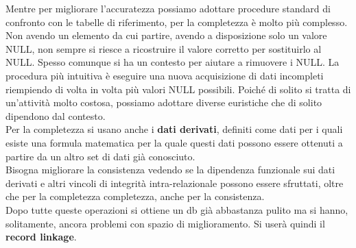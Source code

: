 Mentre per migliorare l'accuratezza possiamo adottare procedure standard di confronto con le tabelle di riferimento, per la completezza è molto più complesso. Non avendo un elemento da cui partire, avendo a disposizione solo un valore NULL, non sempre si riesce a ricostruire il valore corretto per sostituirlo al NULL. Spesso comunque si ha un contesto per aiutare a rimuovere i NULL. La procedura più intuitiva è eseguire una nuova acquisizione di dati incompleti riempiendo di volta in volta più valori NULL possibili. Poiché di solito si tratta di un'attività molto costosa, possiamo adottare diverse euristiche che di solito dipendono dal contesto. \\ 

Per la completezza si usano anche i \textbf{dati derivati}, definiti come dati per i quali esiste una formula matematica per la quale questi dati possono essere ottenuti a partire da un altro set di dati già conosciuto.\\ 
Bisogna migliorare la consistenza vedendo se la dipendenza funzionale sui dati derivati e altri vincoli di integrità intra-relazionale possono essere sfruttati, oltre che per la completezza completezza, anche per la consistenza.\\ 

Dopo tutte queste operazioni si ottiene un db già abbastanza pulito ma si hanno, solitamente, ancora problemi con spazio di miglioramento. Si userà quindi il \textbf{record linkage}.